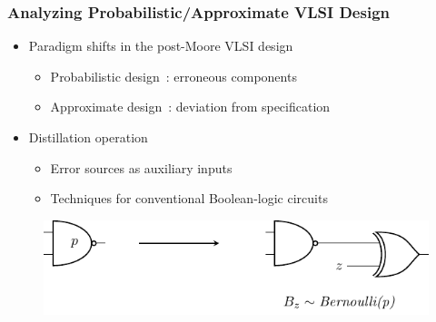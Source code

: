 \begin{frame}
  \frametitle{Analyzing Probabilistic/Approximate VLSI Design}
  \begin{itemize}
    \item Paradigm shifts in the post-Moore VLSI design
          \pause
          \begin{itemize}
            \item Probabilistic design~\cite{Chakrapani2006ProbDesign}: erroneous components
                  \pause
            \item Approximate design~\cite{Venkatesan2011ApproxDesign}: deviation from specification
          \end{itemize}
          \pause
    \item Distillation operation~\cite{LeeTC18ProbDesign}
          \pause
          \begin{itemize}
            \item Error sources as auxiliary inputs
                  \pause
            \item Techniques for conventional Boolean-logic circuits
          \end{itemize}
  \end{itemize}
  \pause
  \begin{figure}
    \centering
    \includegraphics[scale=0.7]{fig/prob-distillation.pdf}
  \end{figure}
\end{frame}

